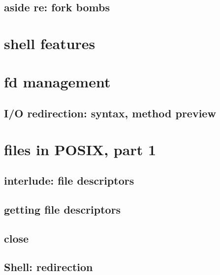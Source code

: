 

\subsection{aside re: fork bombs}



\section{shell features}


\section{fd management}
\subsection{I/O redirection: syntax, method preview}



\section{files in POSIX, part 1}

\subsection{interlude: file descriptors}





\subsection{getting file descriptors}




\subsection{close}



\subsection{Shell: redirection}


